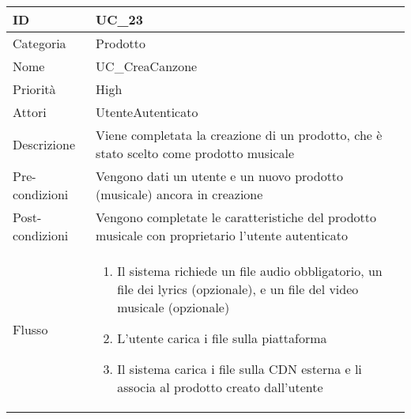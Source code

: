 \begin{center}
\begin{tabular}{ |p{2cm}|p{13cm}|  }
\hline
ID & UC\_23\\\hline
Categoria & Prodotto \\\hline
Nome & UC\_CreaCanzone \\\hline
Priorità & High \\\hline
Attori &  UtenteAutenticato \\\hline
Descrizione & Viene completata la creazione di un prodotto, che è stato scelto come prodotto musicale\\\hline
Pre-condizioni &   Vengono dati un utente e un nuovo prodotto (musicale) ancora in creazione\\\hline
Post-condizioni &  Vengono completate le caratteristiche del prodotto musicale con proprietario l'utente autenticato\\\hline
Flusso &  	\begin{enumerate}
			\item Il sistema richiede un file audio obbligatorio, un file dei lyrics (opzionale), e un file del video musicale (opzionale)
			\item L'utente carica i file sulla piattaforma
			\item Il sistema carica i file sulla CDN esterna e li associa al prodotto creato dall'utente
		\end{enumerate}\\\hline
\end{tabular}
\label{table_use_case:23}\newline


\end{center}
